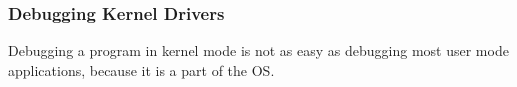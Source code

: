 \subsubsection{Debugging Kernel Drivers}
\label{chap:background.kerneldriver.debugging}

Debugging a program in kernel mode is not as easy as debugging most user mode applications, because it is a part of the OS.